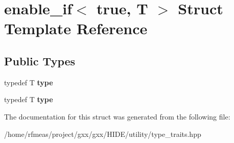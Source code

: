 \hypertarget{structenable__if_3_01true_00_01T_01_4}{}\section{enable\+\_\+if$<$ true, T $>$ Struct Template Reference}
\label{structenable__if_3_01true_00_01T_01_4}
\subsection*{Public Types}
\begin{DoxyCompactItemize}
\item 
typedef T {\bfseries type}\hypertarget{structenable__if_3_01true_00_01T_01_4_ab83a8093e1970e57ad25521ed0780705}{}\label{structenable__if_3_01true_00_01T_01_4_ab83a8093e1970e57ad25521ed0780705}

\item 
typedef T {\bfseries type}\hypertarget{structenable__if_3_01true_00_01T_01_4_ab83a8093e1970e57ad25521ed0780705}{}\label{structenable__if_3_01true_00_01T_01_4_ab83a8093e1970e57ad25521ed0780705}

\end{DoxyCompactItemize}


The documentation for this struct was generated from the following file\+:\begin{DoxyCompactItemize}
\item 
/home/rfmeas/project/gxx/gxx/\+H\+I\+D\+E/utility/type\+\_\+traits.\+hpp\end{DoxyCompactItemize}

